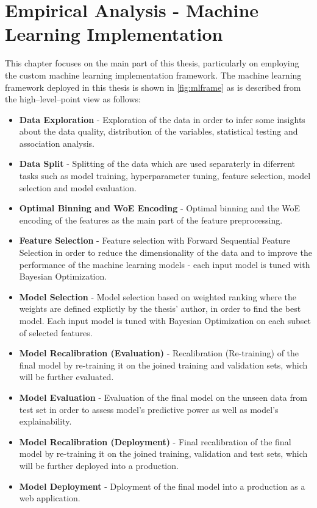 \chapter{Empirical Analysis - Machine Learning Implementation}
\label{chap:four}
This chapter focuses on the main part of this thesis, particularly on employing the custom machine learning implementation framework. The machine learning framework deployed in this thesis is shown in \autoref{fig:mlframe} as is described from the high--level--point view as follows:
\begin{itemize}\setlength\itemsep{0em}
\item \textbf{Data Exploration} - Exploration of the data in order to infer some insights about the data quality, distribution of the variables, statistical testing and association analysis.
\item \textbf{Data Split} - Splitting of the data which are used separaterly in diferrent tasks such as model training, hyperparameter tuning, feature selection, model selection and model evaluation.
\item \textbf{Optimal Binning and WoE Encoding} - Optimal binning and the WoE encoding of the features as the main part of the feature preprocessing.
\item \textbf{Feature Selection} - Feature selection with Forward Sequential Feature Selection in order to reduce the dimensionality of the data and to improve the performance of the machine learning models - each input model is tuned with Bayesian Optimization.
\item \textbf{Model Selection} - Model selection based on weighted ranking where the weights are defined explictly by the thesis' author, in order to find the best model. Each input model is tuned with Bayesian Optimization on each subset of selected features.
\item \textbf{Model Recalibration (Evaluation)} - Recalibration (Re-training) of the final model by re-training it on the joined training and validation sets, which will be further evaluated.
\item \textbf{Model Evaluation} - Evaluation of the final model on the unseen data from test set in order to assess model's predictive power as well as model's explainability.
\item \textbf{Model Recalibration (Deployment)} - Final recalibration of the final model by re-training it on the joined training, validation and test sets, which will be further deployed into a production.
\item \textbf{Model Deployment} - Dployment of the final model into a production as a web application.
\end{itemize}

